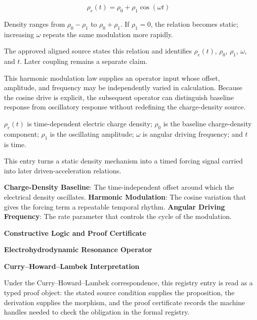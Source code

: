 
\[
\rho_e(t)=\rho_0+\rho_1\cos(\omega t)
\]


Density ranges from \(\rho_0-\rho_1\) to \(\rho_0+\rho_1\). If \(\rho_1=0\), the relation becomes static; increasing \(\omega\) repeats the same modulation more rapidly.


The approved aligned source states this relation and identifies \(\rho_e(t)\), \(\rho_0\), \(\rho_1\), \(\omega\), and \(t\). Later coupling remains a separate claim.


This harmonic modulation law supplies an operator input whose offset, amplitude, and frequency may be independently varied in calculation. Because the cosine drive is explicit, the subsequent operator can distinguish baseline response from oscillatory response without redefining the charge-density source.


\(\rho_e(t)\) is time-dependent electric charge density; \(\rho_0\) is the baseline charge-density component; \(\rho_1\) is the oscillating amplitude; \(\omega\) is angular driving frequency; and \(t\) is time.


This entry turns a static density mechanism into a timed forcing signal carried into later driven-acceleration relations.


\noindent \textbf{Charge-Density Baseline}: The time-independent offset around which the electrical density oscillates. \enspace\textbullet\enspace \textbf{Harmonic Modulation}: The cosine variation that gives the forcing term a repeatable temporal rhythm. \enspace\textbullet\enspace \textbf{Angular Driving Frequency}: The rate parameter that controls the cycle of the modulation.\par

\endgroup

\ifTZPDarkEdition
{}
\fi

\clearpage
\begingroup\tzpsupportsetup
\noindent\textbf{\fontsize{10.8pt}{12.8pt}\selectfont [ID 0126] Constructive Logic and Proof Certificate}\par
\noindent\textbf{\fontsize{10pt}{12pt}\selectfont Electrohydrodynamic Resonance Operator}\par
\vspace{0.45em}
\begingroup
\footnotesize
\setlength{\parskip}{0.22em}
\setlength{\parindent}{0pt}
\noindent\textbf{Curry--Howard--Lambek Interpretation}\par
Under the Curry--Howard--Lambek correspondence, this registry entry is read as a typed proof
object: the stated source condition supplies the proposition, the derivation supplies the
morphism, and the proof certificate records the machine handles needed to check the obligation
in the formal registry.

